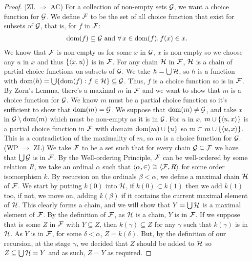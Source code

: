 \begin{proof}
    (ZL $\Longrightarrow$ AC) For a collection of non-empty sets $\mathcal{G}$,
    we want a choice function for $\mathcal{G}$. We define $\mathcal{F}$ to be
    the set of all choice function that exist for subsets of $\mathcal{G}$,
    that is, for $f$ in $\mathcal{F}$: \begin{align*}
        \operatorname{dom}(f) \subseteq \mathcal{G} \text{ and } 
        \forall \, x \in \operatorname{dom}(f), f(x) \in x.
    \end{align*} We know that $\mathcal{F}$ is non-empty as for some
    $x$ in $\mathcal{G}$, $x$ is non-empty so we choose any $u$ in $x$
    and thus $\{{\langle x, u \rangle}\}$ is in $\mathcal{F}$. For any chain $\mathcal{H}$ in
    $\mathcal{F}$, $\mathcal{H}$ is a chain of partial choice functions on subsets
    of $\mathcal{G}$. We take $h = \bigcup \mathcal{H}$, so $h$ is a function
    with $\operatorname{dom}(h) = \bigcup \{\operatorname{dom}(f) : f \in \mathcal{H}\} \subseteq \mathcal{G}$.
    Thus, $f$ is a choice function so is in $\mathcal{F}$.
    \\[\baselineskip]
    By Zorn's Lemma, there's a maximal $m$ in $\mathcal{F}$ and we want
    to show that $m$ is a choice function for $\mathcal{G}$. We know
    $m$ must be a partial choice function so it's sufficient to
    show that $\operatorname{dom}(m) = \mathcal{G}$. We suppose that $\operatorname{dom}(m) \neq \mathcal{G}$,
    and take $x$ in $\mathcal{G} \setminus \operatorname{dom}(m)$ which must be non-empty
    as it is in $\mathcal{G}$. For $u$ in $x$, $m \cup \{{\langle u, x \rangle}\}$
    is a partial choice function in $\mathcal{F}$ with domain
    $\operatorname{dom}(m) \cup \{u\}$ so $m \subset m \cup \{{\langle u, x \rangle}\}$.
    This is a contradiction of the maximality of $m$, 
    so $m$ is a choice function for $\mathcal{G}$.
    \\[\baselineskip]
    (WP $\Longrightarrow$ ZL) We take $\mathcal{F}$ to be a set such that
    for every chain $\mathcal{G} \subseteq \mathcal{F}$ we have that 
    $\bigcup \mathcal{G}$ is in $\mathcal{F}$. By the Well-ordering Principle,
    $\mathcal{F}$ can be well-ordered by some relation $R$, we take
    an ordinal $\alpha$ such that ${\langle \alpha, \in \rangle} \cong {\langle \mathcal{F}, R \rangle}$
    for some order isomorphism $k$. By recursion on the ordinals 
    $\beta < \alpha$, we define a maximal chain $\mathcal{H}$ of $\mathcal{F}$.
    We start by putting $k(0)$ into $\mathcal{H}$, if $k(0) \subset k(1)$
    then we add $k(1)$ too, if not, we move on, adding $k(\beta)$
    if it contains the current maximal element of $\mathcal{H}$. This
    clearly forms a chain, and we will show that $Y = \bigcup \mathcal{H}$ is
    a maximal element of $\mathcal{F}$. By the definition of $\mathcal{F}$, 
    as $\mathcal{H}$ is a chain, $Y$ is in $\mathcal{F}$. If we suppose that
    is some $Z$ in $\mathcal{F}$ with $Y \subseteq Z$, then $k(\gamma)
    \subseteq Z$ for any $\gamma$ such that $k(\gamma)$ is in $\mathcal{H}$.
    As $Y$ is in $\mathcal{F}$, for some $\delta < \alpha$, $Z = k(\delta)$.
    But, by the definition of our recursion, at the stage $\gamma$, we
    decided that $Z$ should be added to $\mathcal{H}$ so 
    $Z \subseteq \bigcup \mathcal{H} = Y$ and as such, $Z = Y$
    as required.
\end{proof}
